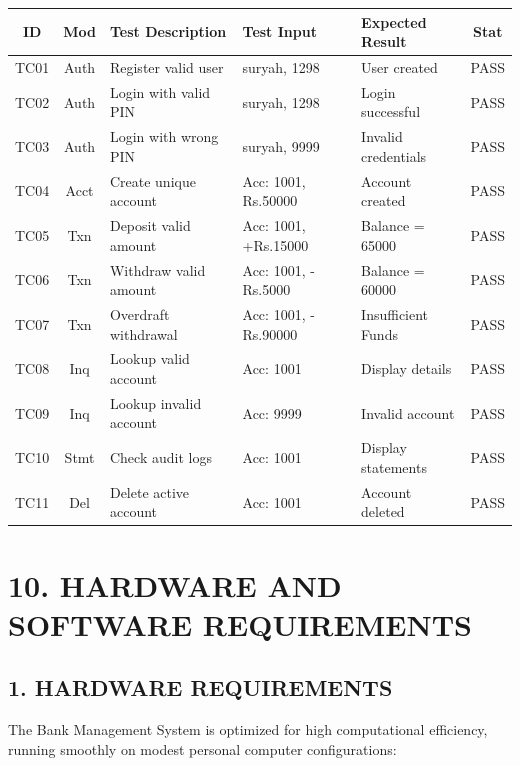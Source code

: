 \documentclass[12pt,a4paper]{article}
\begin{document}
\vspace{0.6em}
\begin{center}
\renewcommand{\arraystretch}{1.25}
\small
\begin{tabular}{|c|c|p{4.2cm}|p{2.8cm}|p{2.6cm}|c|}
\hline
\textbf{ID} & \textbf{Mod} & \textbf{Test Description} & \textbf{Test Input} & \textbf{Expected Result} & \textbf{Stat} \\ \hline
TC01 & Auth & Register valid user & suryah, 1298 & User created & PASS \\ \hline
TC02 & Auth & Login with valid PIN & suryah, 1298 & Login successful & PASS \\ \hline
TC03 & Auth & Login with wrong PIN & suryah, 9999 & Invalid credentials & PASS \\ \hline
TC04 & Acct & Create unique account & Acc: 1001, Rs.50000 & Account created & PASS \\ \hline
TC05 & Txn & Deposit valid amount & Acc: 1001, +Rs.15000 & Balance = 65000 & PASS \\ \hline
TC06 & Txn & Withdraw valid amount & Acc: 1001, -Rs.5000 & Balance = 60000 & PASS \\ \hline
TC07 & Txn & Overdraft withdrawal & Acc: 1001, -Rs.90000 & Insufficient Funds & PASS \\ \hline
TC08 & Inq & Lookup valid account & Acc: 1001 & Display details & PASS \\ \hline
TC09 & Inq & Lookup invalid account & Acc: 9999 & Invalid account & PASS \\ \hline
TC10 & Stmt & Check audit logs & Acc: 1001 & Display statements & PASS \\ \hline
TC11 & Del & Delete active account & Acc: 1001 & Account deleted & PASS \\ \hline
\end{tabular}
\end{center}

\clearpage

\hypertarget{sec:hardware}{}\label{sec:hardware}
\section*{10. HARDWARE AND SOFTWARE REQUIREMENTS}
\vspace{0.5em}

\subsection*{1. HARDWARE REQUIREMENTS}
The Bank Management System is optimized for high computational efficiency, running smoothly on modest personal computer configurations:
\end{document}
